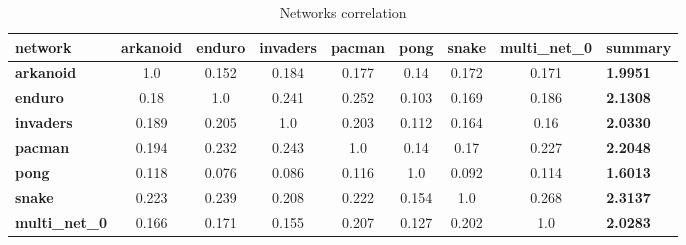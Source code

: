 \documentclass[10pt,a4paper]{article}
\begin{document}
\begin{table}[htb!]
\begin{tabular}{|l|c|c|c|c|c|c|c|l|}
\hline
\textbf{network}       & \textbf{arkanoid} & \textbf{enduro} & \textbf{invaders} & \textbf{pacman} & \textbf{pong} & \textbf{snake} & \textbf{multi\_net\_0} & \textbf{summary} \\ \hline
\textbf{arkanoid}      & 1.0               & 0.152           & 0.184             & 0.177           & 0.14          & 0.172          & 0.171                  & \textbf{1.9951}  \\ \hline
\textbf{enduro}        & 0.18              & 1.0             & 0.241             & 0.252           & 0.103         & 0.169          & 0.186                  & \textbf{2.1308}  \\ \hline
\textbf{invaders}      & 0.189             & 0.205           & 1.0               & 0.203           & 0.112         & 0.164          & 0.16                   & \textbf{2.0330}  \\ \hline
\textbf{pacman}        & 0.194             & 0.232           & 0.243             & 1.0             & 0.14          & 0.17           & 0.227                  & \textbf{2.2048}  \\ \hline
\textbf{pong}          & 0.118             & 0.076           & 0.086             & 0.116           & 1.0           & 0.092          & 0.114                  & \textbf{1.6013}  \\ \hline
\textbf{snake}         & 0.223             & 0.239           & 0.208             & 0.222           & 0.154         & 1.0            & 0.268                  & \textbf{2.3137}  \\ \hline
\textbf{multi\_net\_0} & 0.166             & 0.171           & 0.155             & 0.207           & 0.127         & 0.202          & 1.0                    & \textbf{2.0283}  \\ \hline
\end{tabular}


\caption{Networks correlation}\label{tab:networks_correlation}

\end{table}
\end{document}
